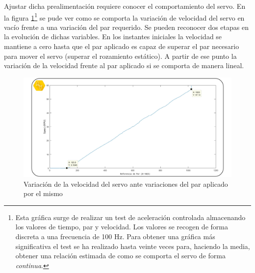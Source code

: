 Ajustar dicha prealimentación requiere conocer el comportamiento del servo. En la figura \ref{fig:Control:control_velocidad_par_1}\footnote{Esta gráfica surge de realizar un test de aceleración controlada almacenando los valores de tiempo, par y velocidad. Los valores se recogen de forma discreta a una frecuencia de 100 Hz. Para obtener una gráfica más significativa el test se ha realizado hasta veinte veces para, haciendo la media, obtener una relación estimada de como se comporta el servo de forma \textit{continua}.} se pude ver como se comporta la variación de velocidad del servo en vacío frente a una variación del par requerido. Se pueden reconocer dos etapas en la evolución de dichas variables. En los instantes iniciales la velocidad se mantiene a cero hasta que el par aplicado es capaz de superar el par necesario para mover el servo (superar el rozamiento estático). A partir de ese punto la variación de la velocidad frente al par aplicado si se comporta de manera lineal.

\begin{figure}
    \centering
    \includegraphics[width=1\textwidth]{figuras/Imagenes_Control/Control_1.jpg}
    \caption{Variación de la velocidad del servo ante variaciones del par aplicado por el mismo}
    \label{fig:Control:control_velocidad_par_1}
\end{figure}

